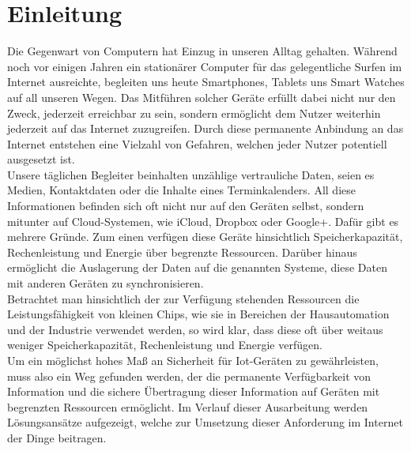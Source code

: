 \documentclass[conference]{IEEEtran}
\begin{document}
\section{Einleitung}
Die Gegenwart von Computern hat Einzug in unseren Alltag gehalten. Während noch vor einigen Jahren ein stationärer Computer für das gelegentliche Surfen im Internet ausreichte, begleiten uns heute Smartphones, Tablets uns Smart Watches auf all unseren Wegen. Das Mitführen solcher Geräte erfüllt dabei nicht nur den Zweck, jederzeit erreichbar zu sein, sondern ermöglicht dem Nutzer weiterhin jederzeit auf das Internet zuzugreifen. Durch diese permanente Anbindung an das Internet entstehen eine Vielzahl von Gefahren, welchen jeder Nutzer potentiell ausgesetzt ist. \\
Unsere täglichen Begleiter beinhalten unzählige vertrauliche Daten, seien es Medien, Kontaktdaten oder die Inhalte eines Terminkalenders. All diese Informationen befinden sich oft nicht nur auf den Geräten selbst, sondern mitunter auf Cloud-Systemen, wie iCloud, Dropbox oder Google+. Dafür gibt es mehrere Gründe. Zum einen verfügen diese Geräte hinsichtlich Speicherkapazität, Rechenleistung und Energie über begrenzte Ressourcen. Darüber hinaus ermöglicht die Auslagerung der Daten auf die genannten Systeme, diese Daten mit anderen Geräten zu synchronisieren. \\
Betrachtet man hinsichtlich der zur Verfügung stehenden Ressourcen die Leistungsfähigkeit von kleinen Chips, wie sie in Bereichen der Hausautomation und der Industrie verwendet werden, so wird klar, dass diese oft über weitaus weniger Speicherkapazität, Rechenleistung und Energie verfügen. \\
Um ein möglichst hohes Maß an Sicherheit für Iot-Geräten zu gewährleisten, muss also ein Weg gefunden werden, der die permanente Verfügbarkeit von Information und die sichere Übertragung dieser Information auf Geräten mit begrenzten Ressourcen ermöglicht. Im Verlauf dieser Ausarbeitung werden Lösungsansätze aufgezeigt, welche zur Umsetzung dieser Anforderung im Internet der Dinge beitragen.


 


\end{document}
